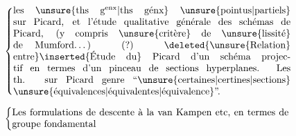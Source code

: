 \noindent$\left\{\begin{minipage}{.83\linewidth}les \unsure{ths g\textsuperscript{enx}|ths génx} \unsure{pointus|partiels} sur Picard, et l'étude qualitative générale des schémas de Picard, (y compris \unsure{critère} de \unsure{lissité} de Mumford\ldots)

(?) \deleted{\unsure{Relation} entre}\inserted{Étude du} Picard d'un schéma projectif en termes d'un pinceau de sections hyperplanes.

Les th. sur Picard genre ``\unsure{certaines|certines|sections} \unsure{équivalences|équivalentes|équivalence}''.\end{minipage}\right.$

\noindent$\left\{\begin{minipage}{.83\linewidth}Les formulations de descente à la van Kampen etc, en termes de groupe fondamental\end{minipage}\right.$
\normalmarginpar

